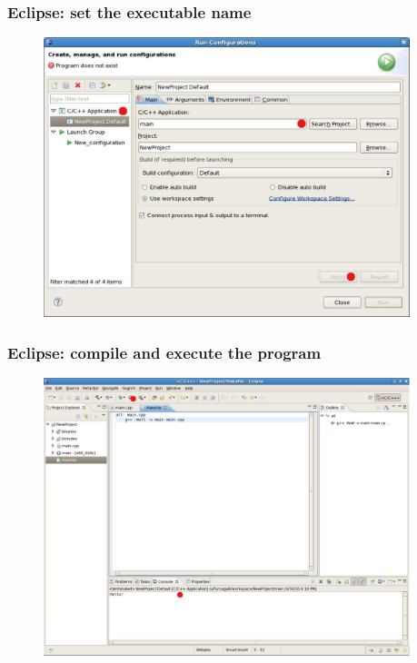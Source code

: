\documentclass{beamer}
\begin{document}

\begin{frame}[fragile]

    \frametitle{Eclipse: set the executable name}

    \begin{figure}
        \centering
        \includegraphics[width=0.95\textwidth]{./images/eclipse10}
    \end{figure}

\end{frame}


\begin{frame}[fragile]

    \frametitle{Eclipse: compile and execute the program}

    \begin{figure}
        \centering
        \includegraphics[width=0.95\textwidth]{./images/eclipse11}
    \end{figure}

\end{frame}
\end{document}
